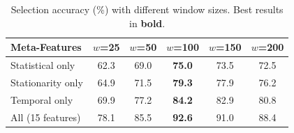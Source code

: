 \begin{table}[t]
\centering
\caption{Selection accuracy (\%) with different window sizes. Best results in \textbf{bold}.}
\label{tab:window_sensitivity}
\begin{tabular}{lccccc}
\toprule
Meta-Features & $w$=25 & $w$=50 & $w$=100 & $w$=150 & $w$=200 \\
\midrule
Statistical only & 62.3 & 69.0 & \textbf{75.0} & 73.5 & 72.5 \\
Stationarity only & 64.9 & 71.5 & \textbf{79.3} & 77.9 & 76.2 \\
Temporal only & 69.9 & 77.2 & \textbf{84.2} & 82.9 & 80.8 \\
All (15 features) & 78.1 & 85.5 & \textbf{92.6} & 91.0 & 88.4 \\
\bottomrule
\end{tabular}
\end{table}